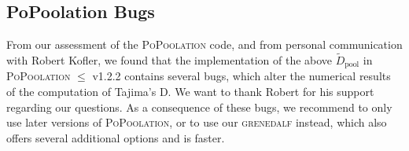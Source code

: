 \documentclass[a4paper,fontsize=9pt,DIV=14]{scrartcl}
\newcounter{todo}
\newcounter{popoolissue}
\newcommand\todo[1]{}
\newcommand\popoolissue[1]{}
\newcommand\toolname{\textsc}
\begin{document}




\subsection{PoPoolation Bugs}
\label{supp:sec:TajimaD:sub:Bugs}

From our assessment of the \toolname{PoPoolation} code, and from personal communication with Robert Kofler, we found that the implementation of the above $\tilde{D}_\text{pool}$ in \toolname{PoPoolation} $\leq$ v1.2.2 contains several bugs, which alter the numerical results of the computation of Tajima's D.
We want to thank Robert for his support regarding our questions.
As a consequence of these bugs, we recommend to only use later versions of \toolname{PoPoolation}, or to use our \toolname{grenedalf} instead, which also offers several additional options and is faster.

\popoolissue{These are the two bugs that we were already in contact with. We already have stated them in the parts of this document where they come up. We just kept this section here for reference, as it is in our preprint.}

\end{document}
